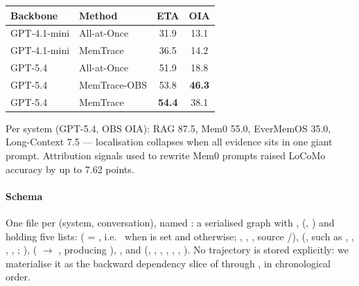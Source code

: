 \begin{center}\small
\begin{tabular}{@{}llcc@{}}\toprule
Backbone & Method & ETA & OIA\\\midrule
GPT-4.1-mini & All-at-Once & 31.9 & 13.1\\
GPT-4.1-mini & MemTrace & 36.5 & 14.2\\
GPT-5.4 & All-at-Once & 51.9 & 18.8\\
GPT-5.4 & MemTrace-OBS & 53.8 & \textbf{46.3}\\
GPT-5.4 & MemTrace & \textbf{54.4} & 38.1\\\bottomrule
\end{tabular}
\end{center}
Per system (GPT-5.4, OBS OIA): RAG 87.5, Mem0 55.0, EverMemOS 35.0, Long-Context 7.5 --- localisation collapses when all evidence sits in one giant prompt. Attribution signals used to rewrite Mem0 prompts raised LoCoMo accuracy by up to 7.62 points.

\paragraph{Schema} One file per (system, conversation), named  : a serialised  graph with ,  (, ) and  holding five lists:  ( = , i.e.\  when  is set and  otherwise; , , , source /),  (,  such as , , , , ; ),  ( $\to$ , producing ), , and  (, , , , , , ). No trajectory is stored explicitly: we materialise it as the backward dependency slice of  through , in chronological order.

